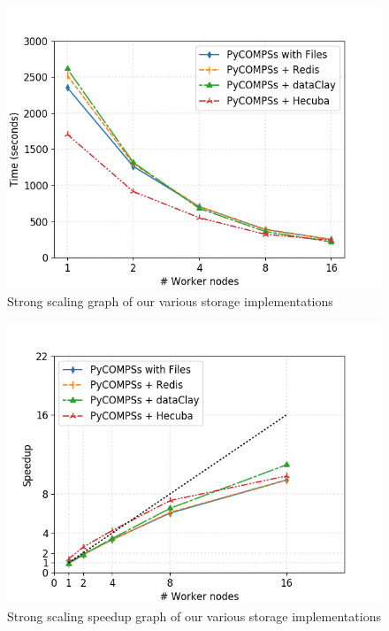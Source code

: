 \begin{figure}[ht!]
\centering
\includegraphics[scale = 0.5]{figures/storage/kmeans_strong.png}
\caption{Strong scaling graph of our various storage implementations}
\label{fig:kmeans_strong_redis}
\end{figure}

\begin{figure}[ht!]
\centering
\includegraphics[scale = 0.5]{figures/storage/kmeans_strong_speedup.png}
\caption{Strong scaling speedup graph of our various storage implementations}
\label{fig:kmeans_strong_speedup_redis}
\end{figure}

